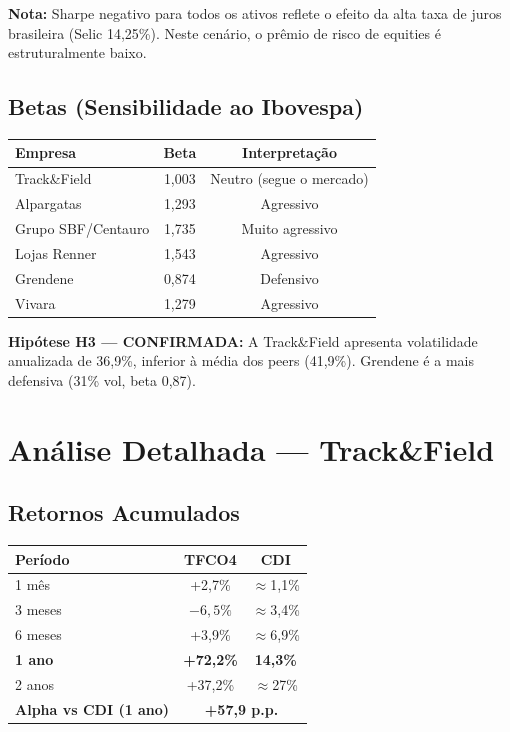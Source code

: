 \documentclass[12pt, a4paper]{article}
\begin{document}
\textbf{Nota:} Sharpe negativo para todos os ativos reflete o efeito da alta taxa de juros brasileira (Selic 14,25\%). Neste cenário, o prêmio de risco de equities é estruturalmente baixo.

\subsection{Betas (Sensibilidade ao Ibovespa)}

\begin{center}
\begin{tabular}{lcc}
\toprule
\textbf{Empresa} & \textbf{Beta} & \textbf{Interpretação} \\
\midrule
\rowcolor{cinzatabela}
Track\&Field & 1,003 & Neutro (segue o mercado) \\
Alpargatas & 1,293 & Agressivo \\
\rowcolor{cinzatabela}
Grupo SBF/Centauro & 1,735 & Muito agressivo \\
Lojas Renner & 1,543 & Agressivo \\
\rowcolor{cinzatabela}
Grendene & 0,874 & \textcolor{verdepositivo}{Defensivo} \\
Vivara & 1,279 & Agressivo \\
\bottomrule
\end{tabular}
\end{center}

\textbf{Hipótese H3 --- CONFIRMADA:} A Track\&Field apresenta volatilidade anualizada de 36,9\%, inferior à média dos peers (41,9\%). Grendene é a mais defensiva (31\% vol, beta 0,87).

\section{Análise Detalhada --- Track\&Field}

\subsection{Retornos Acumulados}

\begin{center}
\begin{tabular}{lcc}
\toprule
\textbf{Período} & \textbf{TFCO4} & \textbf{CDI} \\
\midrule
1 mês & +2,7\% & $\approx$1,1\% \\
3 meses & $-6,5\%$ & $\approx$3,4\% \\
6 meses & +3,9\% & $\approx$6,9\% \\
\textbf{1 ano} & \textcolor{verdepositivo}{\textbf{+72,2\%}} & \textbf{14,3\%} \\
2 anos & +37,2\% & $\approx$27\% \\
\midrule
\textbf{Alpha vs CDI (1 ano)} & \multicolumn{2}{c}{\textcolor{verdepositivo}{\textbf{+57,9 p.p.}}} \\
\bottomrule
\end{tabular}
\end{center}
\end{document}
